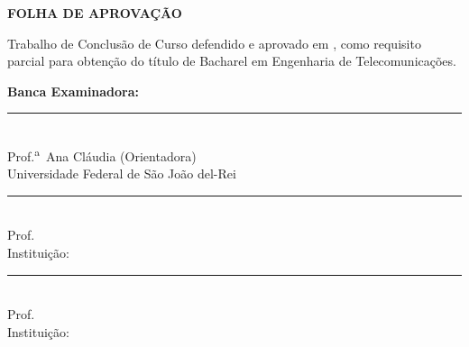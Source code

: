 \documentclass[12pt,a4paper]{article}
\begin{document}
\pagestyle{empty}
\begin{center}\textbf{FOLHA DE APROVAÇÃO}\end{center}
\vspace{1.5cm}
\noindent
Trabalho de Conclusão de Curso defendido e aprovado em
\underline{\hspace{4cm}}, como requisito parcial para obtenção do título de
Bacharel em Engenharia de Telecomunicações.

\vspace{2cm}
\noindent\textbf{Banca Examinadora:}

\vspace{1cm}
\noindent\rule{10cm}{0.4pt}\\
Prof.\textsuperscript{a}\ Ana Cláudia (Orientadora)\\
Universidade Federal de São João del-Rei

\vspace{0.8cm}
\noindent\rule{10cm}{0.4pt}\\
Prof.\ \underline{\hspace{6cm}}\\
Instituição: \underline{\hspace{5.2cm}}

\vspace{0.8cm}
\noindent\rule{10cm}{0.4pt}\\
Prof.\ \underline{\hspace{6cm}}\\
Instituição: \underline{\hspace{5.2cm}}

\newpage
\pagestyle{fancy}
\end{document}
